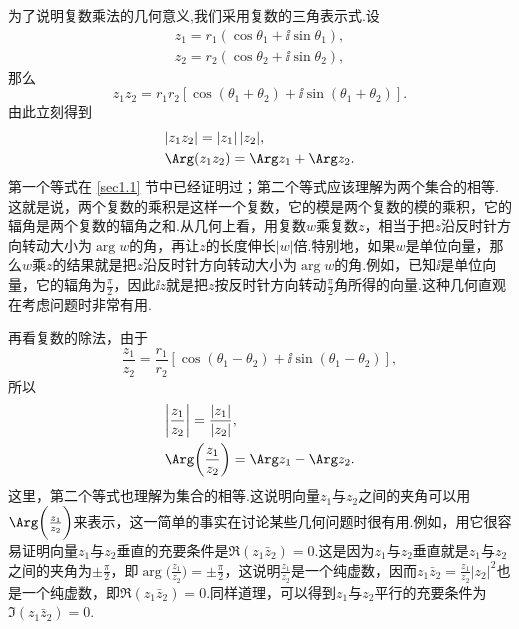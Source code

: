 为了说明复数乘法的几何意义,我们采用复数的三角表示式.设
\begin{gather*}
z_1=r_1(\cos\theta_1+\ii\sin\theta_1),\\
z_2=r_2(\cos\theta_2+\ii\sin\theta_2),
\end{gather*}
那么
\[z_1z_2=r_1r_2[\cos(\theta_1+\theta_2)+\ii\sin(\theta_1+\theta_2)].\]
由此立刻得到
\begin{align*}
&|z_1z_2|=|z_1|\,|z_2|,\\
&\Arg(z_1z_2)=\Arg z_1+\Arg z_2.
\end{align*}
第一个等式在 \ref{sec1.1} 节中已经证明过；第二个等式应该理解为两个集合的相等.这就是说，两个复数的乘积是这样一个复数，它的模是两个复数的模的乘积，它的辐角是两个复数的辐角之和.从几何上看，用复数$w$乘复数$z$，相当于把$z$沿反时针方向转动大小为$\arg w$的角，再让$z$的长度伸长$|w|$倍.特别地，如果$w$是单位向量，那么$w$乘$z$的结果就是把$z$沿反时针方向转动大小为$\arg w$的角.例如，已知$\ii$是单位向量，它的辐角为$\frac\pi2$，因此$\ii z$就是把$z$按反时针方向转动$\frac\pi2$角所得的向量.这种几何直观在考虑问题时非常有用.

再看复数的除法，由于
\[\frac{z_1}{z_2}=\frac{r_1}{r_2}[\cos(\theta_1-\theta_2)+\ii\sin(\theta_1-\theta_2)],\]
所以
\begin{align*}
&\bigg|\frac{z_1}{z_2}\bigg|=\frac{|z_1|}{|z_2|},\\
&\Arg\bigg(\frac{z_1}{z_2}\bigg)=\Arg z_1-\Arg z_2.
\end{align*}
这里，第二个等式也理解为集合的相等.这说明向量$z_1$与$z_2$之间的夹角可以用$\Arg \bigg(\frac{z_1}{z_2}\bigg)$来表示，这一简单的事实在讨论某些几何问题时很有用.例如，用它很容易证明向量$z_1$与$z_2$垂直的充要条件是$\Re (z_1\bar z_2)=0$.这是因为$z_1$与$z_2$垂直就是$z_1$与$z_2$之间的夹角为$\pm\frac\pi2$，即$\arg \bigg(\frac{z_1}{z_2}\bigg)=\pm\frac\pi2$，这说明$\frac{z_1}{z_2}$是一个纯虚数，因而$z_1\bar z_2=\frac{z_1}{z_2}|z_2|^2$也是一个纯虚数，即$\Re(z_1\bar z_2)=0$.同样道理，可以得到$z_1$与$z_2$平行的充要条件为$\Im(z_1\bar z_2)=0$.

